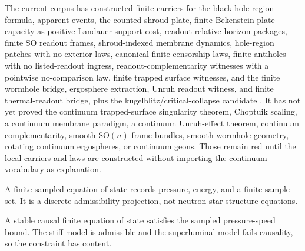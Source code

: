 \begin{theorem}\label{thm:external-horizon-physics-frontier-map}\notready{}
The current corpus has constructed finite carriers for the black-hole-region formula,
apparent events, the counted shroud plate, finite Bekenstein-plate capacity as
positive Landauer support cost, readout-relative horizon packages, finite SO
readout frames,
shroud-indexed membrane dynamics, hole-region patches with no-exterior laws,
canonical finite censorship laws, finite antiholes with no listed-readout
ingress,
readout-complementarity witnesses with a pointwise no-comparison law, finite
trapped surface witnesses, and the finite wormhole bridge, ergosphere
extraction, Unruh readout witness, and finite thermal-readout bridge, plus the
kugelblitz/critical-collapse candidate
.
It has not yet proved the continuum trapped-surface singularity theorem,
Choptuik scaling, a continuum membrane paradigm, a continuum Unruh-effect
theorem,
continuum complementarity, smooth \(\mathrm{SO}(n)\) frame bundles, smooth
wormhole geometry, rotating continuum ergospheres, or continuum geons.  Those
remain red until the local carriers and laws are constructed without importing
the continuum vocabulary as explanation.
\end{theorem}

\begin{proposition}\label{thm:finite-eos}\leanok{}
A finite sampled equation of state records pressure, energy, and a finite sample
set.  It is a discrete admissibility projection, not neutron-star structure
equations.
\end{proposition}

\begin{theorem}\label{thm:eos-speed-bound}\leanok{}
A stable causal finite equation of state satisfies the sampled pressure-speed
bound.  The stiff model is admissible and the superluminal model fails
causality, so the constraint has content.
\end{theorem}

